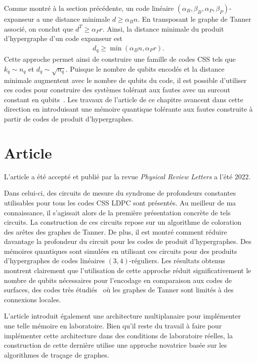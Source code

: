 Comme montré à la section précédente,
un code linéaire $(\alpha_B, \beta_B, \alpha_P, \beta_P)$-expanseur a une
distance minimale $d \geq \alpha_B n$.
En transposant le graphe de Tanner associé,
on conclut que $d^T \geq \alpha_P r$.
Ainsi,
la distance minimale du produit d'hypergraphe d'un code expanseur est~\cite{leverrier_quantum_2015}
\begin{align}
	d_q \geq \min(\alpha_B n, \alpha_P r).
\end{align}
Cette approche permet ainsi de construire une famille de codes CSS tels que
$k_q \sim n_q$ et $d_q \sim \sqrt{n_q}$.
Puisque le nombre de qubits encodés et la distance minimale augmentent avec le nombre 
de qubits du code,
il est possible d'utiliser ces codes pour construire des systèmes tolérant aux fautes
avec un surcout constant en qubits~\cite{gottesman_fault-tolerant_2013}.
Les travaux de l'article de ce chapitre avancent dans cette direction 
en introduisant une mémoire quantique tolérante aux fautes construite
à partir de codes de produit d'hypergraphes.

\section{Article}

L'article a été accepté et publié par la revue \textit{Physical Review Letters} a l'été 2022.

Dans celui-ci,
des circuits de mesure du syndrome de profondeurs constantes utilisables
pour tous les codes CSS LDPC sont présentés.
Au meilleur de ma connaissance,
il s'agissait alors de la première présentation concrète de tels circuits.
La construction de ces circuits repose sur un algorithme de coloration des
arêtes des graphes de Tanner.
De plus,
il est montré comment réduire davantage la profondeur du circuit pour les codes 
de produit d'hypergraphes.
Des mémoires quantiques sont simulées en utilisant ces circuits pour des 
produits d'hypergraphes de codes linéaires $(3, 4)$-réguliers.
Les résultats obtenus montrent clairement que l'utilisation de cette approche
réduit significativement le nombre de qubits nécessaires pour l'encodage
en comparaison aux codes de surfaces,
des codes très étudiés~\cite{kitaev_fault-tolerant_2003, dennis_topological_2002, fowler_surface_2012, fowler_high_2009, stephens_fault-tolerant_2014, bravyi_efficient_2014, darmawan_tensor-network_2017} 
où les graphes de Tanner sont limités à des connexions locales.

L'article introduit également une architecture multiplanaire pour implémenter une telle mémoire
en laboratoire.
Bien qu'il reste du travail à faire pour implémenter cette architecture
dans des conditions de laboratoire réelles,
la construction de cette dernière utilise une approche novatrice basée sur les algorithmes de traçage de
graphes.


